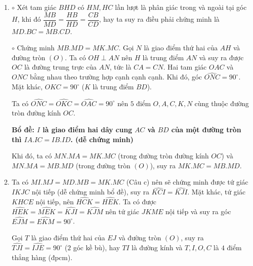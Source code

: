 \begin{bt}
{\begin{enumerate}
			Xét hai tam giác $OHB$ và $OBC$. Ta có
			$\heva{&\widehat{BOH}=\widehat{COB}\\&\dfrac{OH}{OB}=\dfrac{OB}{OC},}$ nên hai tam giác $OHB$ và $OBC$
			đồng dạng với nhau (trường hợp c.g.c).
			
			Từ đó suy ra $\widehat{OHB}=\widehat{OBC}$. Mà $\widehat{OBC}=90^{\circ}-\widehat{ACD}=90^{\circ}-\widehat{DHM}$ (tứ giác $AHDC$ nội tiếp). Bên cạnh đó,     $\widehat{OHB}=90^{\circ}-\widehat{BHM}$. Suy ra, góc $\widehat{BHM}=\widehat{DHM}$, $ HM $ là tia phân giác của góc $BHD$.        
			\item 	 $\circ$
			Xét tam giác $BHD$ có $HM,HC$ lần lượt là phân giác trong và ngoài tại góc $H$, khi đó $\dfrac{MB}{MD}=\dfrac{HB}{HD}=\dfrac{CB}{CD}$, hay ta suy ra điều phải chứng minh là $MD.BC=MB.CD$.
			
			$\circ$ Chứng minh $MB.MD=MK.MC$. Gọi $N$ là giao điểm thứ hai của $AH$ và đường tròn $(O)$. Ta có $OH\perp AN$ nên $H$ là trung điểm $AN$ và suy ra được $OC$ là đường trung trực của $AN$, tức là $CA=CN$. Hai tam giác $OAC$ và $ONC$ bằng nhau theo trường hợp cạnh cạnh cạnh. Khi đó, góc $\widehat{ONC}=90^{\circ}$. Mặt khác, $\widehat{OKC}=90^{\circ}$ ($ K $ là trung điểm $BD$).
			
			Ta có $\widehat{ONC}=\widehat{OKC}=\widehat{OAC}=90^{\circ}$ nên $5$ điểm $O,A,C,K,N$ cùng thuộc đường tròn đường kính $OC$.
			
			\textbf{Bổ đề: $I$ là giao điểm hai dây cung $AC$ và $BD$ của một đường tròn thì $IA.IC=IB.ID$. (dễ chứng minh)}
			
			Khi đó, ta có $MN.MA=MK.MC$ (trong đường tròn đường kính $ OC $) và $MN.MA=MB.MD$ (trong đường tròn $ (O) $), suy ra $MK.MC=MB.MD$.
			
			\item Ta có $MI.MJ=MD.MB=MK.MC$ (Câu c) nên sẽ chứng minh được tứ giác $IKJC$ nội tiếp (dễ chứng minh bổ đề), suy ra $\widehat{KCI}=\widehat{KJI}$. Mặt khác, tứ giác $KHCE$ nội tiếp, nên $\widehat{HCK}=\widehat{HEK}$. Ta có được $\widehat{HEK}=\widehat{MEK}=\widehat{KJI}=\widehat{KJM}$ nên tứ giác $JKME$ nội tiếp và suy ra góc $\widehat{EJM}=\widehat{EKM}=90^{\circ}$.
			
			Gọi $T$ là giao điểm thứ hai của $EJ$ và đường tròn $(O)$, suy ra $\widehat{TJI}=\widehat{IJE}=90^{\circ}$ ($ 2 $ góc kề bù), hay $TI$ là đường kính và $T,I,O,C$ là $4$ điểm thẳng hàng (đpcm).
		\end{enumerate}
	}
\end{bt}

